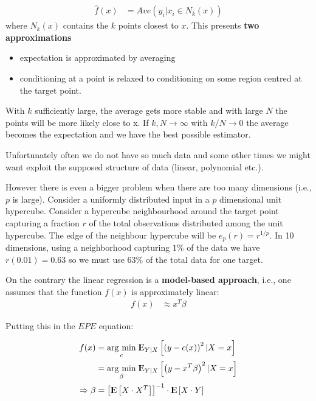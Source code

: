 \documentclass[12pt, letterpaper]{article}
\theoremstyle{definition}
\newcommand{\E}{{\rm I\kern-.3em E}}
\newcommand{\argmin}[1]{\underset{#1}{\operatorname{arg}\,\operatorname{min}}\;}
\begin{document}
\begin{align}
\hat{f} (x) &= Ave \left(   y_i|x_i \in N_k(x)   \right)
\end{align}
where $N_k(x) $ contains the $k$ points closest to $x$. This presents \textbf{two approximations}
\begin{itemize}
\item expectation is approximated by averaging
\item conditioning at a point is relaxed to conditioning on some region centred at the target point.
\end{itemize}

With $k$ sufficiently large, the average gets more stable and with large $N$ the points will be more likely close to x. If $k, N \rightarrow \infty$ with $k/N \rightarrow 0$ the average becomes the expectation and we have the best possible estimator.

Unfortunately often we do not have so much data and some other times we might want exploit the supposed structure of data (linear, polynomial etc.).

However there is even a bigger problem when there are too many dimensions (i.e., $p$ is large). Consider a uniformly distributed input in a $p$ dimensional unit hypercube. Consider a hypercube neighbourhood around the target point capturing a fraction $r$ of the total observations distributed among the unit hypercube. The edge of the neighbour hypercube will be $e_p(r) = r^{1/p}$. In 10 dimensions, using a neighborhood capturing $1\%$ of the data we have $r(0.01) = 0.63$ so we must use 63\% of the total data for one target.

On the contrary the linear regression is a \textbf{model-based approach}, i.e., one assumes that the function $f(x)$ is approximately linear:
\begin{align}
f(x) &\approx x^T \beta
\end{align}

Putting this in the $EPE$ equation:

\begin{equation}
\begin{aligned}
f(x) &= \argmin{c} \E_{Y|X} \left[ \left( y - c(x) \right)^2 | X=x \right]  \\
&= \argmin{\beta} \E_{Y|X} \left[ \left( y - x^T \beta \right)^2 | X=x \right] \\
\Rightarrow \beta &= \left[ \E\left[ X\cdot X ^T\right]\right]^{-1} \cdot \E\left[ X\cdot Y \right]
\end{aligned}
\end{equation}
\end{document}
